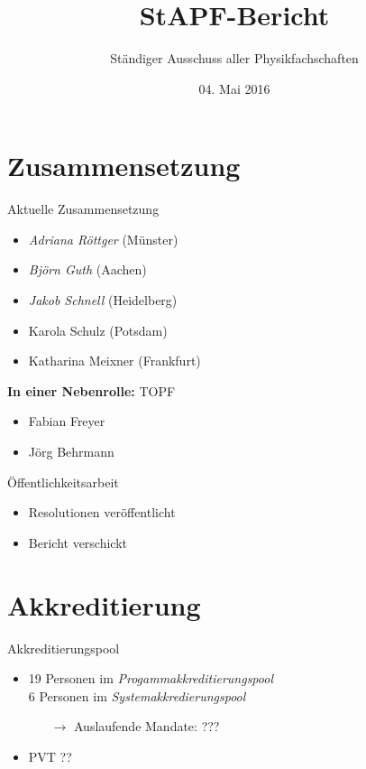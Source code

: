 \documentclass[compress,]{beamer}
\title[StAPf-Bericht]{StAPF-Bericht}
\author{Ständiger Ausschuss aller Physikfachschaften}
\institute[Zusammenkunft aller Physikfachschaften]
\date{04. Mai 2016}
\begin{document}
\begin{frame}[plain]{}
  \titlepage
\end{frame}

\section{Zusammensetzung}

\begin{frame}{Aktuelle Zusammensetzung}
	\begin{itemize}
		\item \emph{Adriana Röttger} (Münster)
		\item \emph{Björn Guth} (Aachen)
		\item \emph{Jakob Schnell} (Heidelberg)
		\item Karola Schulz (Potsdam)
		\item Katharina Meixner (Frankfurt)
	\end{itemize}
	\textbf{In einer Nebenrolle:} TOPF
	\begin{itemize}
		\item Fabian Freyer
		\item Jörg Behrmann
	\end{itemize}
\end{frame}

\begin{frame}{Öffentlichkeitsarbeit}
	\begin{itemize}
		\item Resolutionen veröffentlicht
		\item Bericht verschickt
	\end{itemize}
\end{frame}

\section{Akkreditierung}

\begin{frame}{Akkreditierungspool}
	\begin{itemize}
		\item 19 Personen im \emph{Progammakkreditierungspool}\\
			6 Personen im \emph{Systemakkredierungspool}
			\begin{itemize}
				\item[$\rightarrow$] Auslaufende Mandate: ???
			\end{itemize}
		\item PVT ??
	\end{itemize}
\end{frame}
\end{document}

